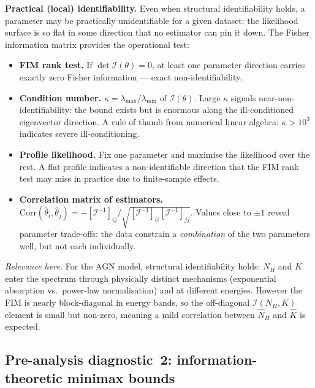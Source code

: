 \documentclass[11pt, a4paper]{article}
\begin{document}
\medskip
\noindent\textbf{Practical (local) identifiability.}
Even when structural identifiability holds, a parameter may be practically
unidentifiable for a given dataset: the likelihood surface is so flat in some
direction that no estimator can pin it down.
The Fisher information matrix provides the operational test:

\begin{itemize}[noitemsep]
    \item \textbf{FIM rank test.}
    If $\det\mathcal{I}(\theta) = 0$, at least one parameter direction carries
    exactly zero Fisher information --- exact non-identifiability.
    \item \textbf{Condition number.}
    $\kappa = \lambda_{\max}/\lambda_{\min}$ of $\mathcal{I}(\theta)$.
    Large $\kappa$ signals near-non-identifiability: the bound exists but is
    enormous along the ill-conditioned eigenvector direction.
    A rule of thumb from numerical linear algebra: $\kappa > 10^3$ indicates
    severe ill-conditioning.
    \item \textbf{Profile likelihood.}
    Fix one parameter and maximise the likelihood over the rest.
    A flat profile indicates a non-identifiable direction that the FIM rank
    test may miss in practice due to finite-sample effects.
    \item \textbf{Correlation matrix of estimators.}
    $\mathrm{Corr}(\hat\theta_i,\hat\theta_j) =
    -[\mathcal{I}^{-1}]_{ij}/\sqrt{[\mathcal{I}^{-1}]_{ii}[\mathcal{I}^{-1}]_{jj}}$.
    Values close to $\pm 1$ reveal parameter trade-offs: the data constrain a
    \emph{combination} of the two parameters well, but not each individually.
\end{itemize}

\noindent\textit{Relevance here.}
For the AGN model, structural identifiability holds: $N_H$ and $K$ enter the
spectrum through physically distinct mechanisms (exponential absorption vs.\ power-law
normalisation) and at different energies.
However the FIM is nearly block-diagonal in energy bands, so the off-diagonal
$\mathcal{I}(N_H, K)$ element is small but non-zero, meaning a mild correlation
between $\hat N_H$ and $\hat K$ is expected.

\subsection*{Pre-analysis diagnostic~2: information-theoretic minimax bounds}
\label{sec:minimax}
\end{document}
